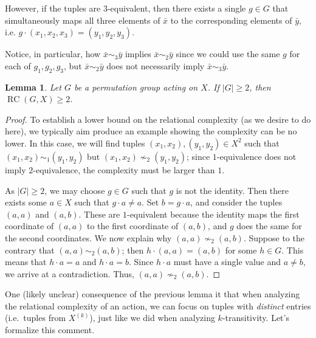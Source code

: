 \documentclass[11pt]{amsart}
\theoremstyle{plain}
\newtheorem*{lemma*}{Lemma}
\theoremstyle{definition}
\theoremstyle{remark}
\DeclareMathOperator{\rc}{RC}
\begin{document}
However, if the tuples are $3$-equivalent, then there  exists a single $g\in G$ that simultaneously maps all three elements of $\bar{x}$ to the corresponding elements of $\bar{y}$, i.e.  $g\cdot(x_1,x_2,x_3) = (y_1,y_2,y_3)$. 
\begin{center}
\end{center}

Notice, in particular, how $\bar{x}\sim_3\bar{y}$ implies $\bar{x}\sim_2\bar{y}$ since we could use the same $g$ for each of $g_1,g_2,g_3$, but $\bar{x}\sim_2\bar{y}$ does not necessarily imply $\bar{x}\sim_3\bar{y}$.

\begin{lemma*}\label{lem.RCAtLeast2}
Let $G$ be a permutation group acting on $X$. If $|G| \ge 2$, then $\rc(G,X)\ge 2$. 
\end{lemma*}
\begin{proof}
To establish a lower bound on the relational complexity (as we desire to do here), we typically aim produce an example showing the complexity can be no lower. In this case, we will find tuples $(x_1,x_2),(y_1,y_2)\in X^2$ such that $(x_1,x_2)\sim_1 (y_1,y_2)$ but $(x_1,x_2)\nsim_2(y_1,y_2)$; since $1$-equivalence does not imply $2$-equivalence, the complexity must be larger than $1$.

As $|G| \ge 2$, we may choose $g\in G$ such that $g$ is not the identity. Then there exists some $a\in X$ such that $g\cdot a \neq a$. Set $b=g\cdot a$, and consider the tuples $(a,a)$ and $(a,b)$. These are $1$-equivalent because the identity maps the first coordinate of $(a,a)$ to the first coordinate of $(a,b)$, and $g$ does the same for the second coordinates. We now explain why $(a,a)\nsim_2(a,b)$. Suppose to the contrary that $(a,a)\sim_2(a,b)$; then $h\cdot (a,a)=(a,b)$ for some $h\in G$. This means that $h\cdot a= a$ and $h\cdot a= b$. Since $h\cdot a$ must have a single value and $a\neq b$, we arrive at a contradiction. Thus, $(a,a)\nsim_2(a,b)$.
\end{proof}

One (likely unclear) consequence of the previous lemma it that when analyzing the relational complexity of an action, we can focus on tuples with \emph{distinct} entries (i.e.~tuples from $X^{(k)}$), just like we did when analyzing $k$-transitivity. Let's formalize this comment.
\end{document}
